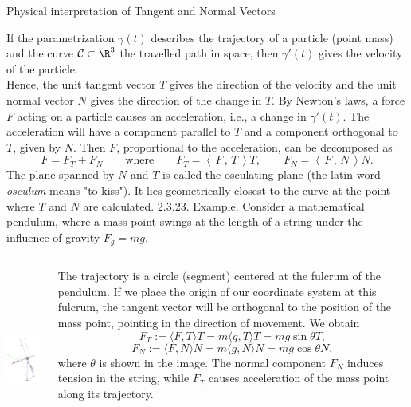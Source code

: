 \documentclass[smaller,hyperref={CJKbookmarks=true}]{beamer}
\newcommand{\scp}[2]{\left\langle\,#1\,,\,#2\,\right\rangle} \newcommand{\scpp}{\langle\,\cdot\,,\,\cdot\,\rangle}
\begin{document}
\begin{frame}{Physical interpretation of Tangent and Normal Vectors}
\begin{spacing}{1}
If the parametrization $\gamma(t)$ describes the trajectory of a particle (point
mass) and the curve $\mathcal{C}\subset\R^3$ the travelled path in space, then $\gamma'(t)$ gives
the velocity of the particle.\\[10pt]
Hence, the unit tangent vector $T$ gives the direction of the velocity and
the unit normal vector $N$ gives the direction of the change in $T$. By
Newton's laws, a force $F$ acting on a particle causes an acceleration, i.e., a
change in $\gamma'(t)$. The acceleration will have a component parallel to $T$ and
a component orthogonal to $T$, given by $N$. Then $F$, proportional to the
acceleration, can be decomposed as
\[F=F_T+F_N\qquad\text{where}\qquad
F_T=\scp{F}{T}T,\qquad F_N=\scp{F}{N}N.\]
The plane spanned by $N$ and $T$ is called the osculating plane (the latin
word \emph{osculum} means "to kiss"). It lies geometrically closest to the curve
at the point where $T$ and $N$ are calculated.
\newpage
\alert{2.3.23. Example.} Consider a mathematical pendulum, where a mass point swings at the length of a string under the influence of gravity $F_g=mg$.\\[9pt]
\begin{columns}[onlytextwidth]
\begin{column}{0.4\textwidth}
\includegraphics[width=\columnwidth,height=170pt]{87.jpg}
\end{column}
\begin{column}{0.6\textwidth}
The trajectory is a circle (segment) centered
at the fulcrum of the pendulum. If we place
the origin of our coordinate system at this
fulcrum, the tangent vector will be orthogonal
to the position of the mass point, pointing in
the direction of movement. We obtain
\[F_T:=\langle F,T\rangle T=m\langle g,T\rangle T=mg\sin\theta T,\]
\[F_N:=\langle F,N\rangle N=m\langle g,N\rangle N=mg\cos\theta N,\]
where $\theta$ is shown in the image. The normal component $F_N$ induces tension in the string, while $F_T$ causes acceleration of the mass point along its trajectory.
\end{column}
\end{columns}
\end{spacing}
\end{frame}
\end{document}
